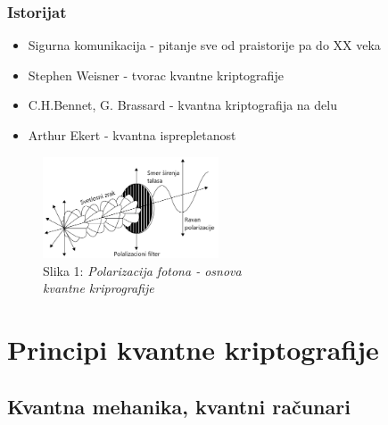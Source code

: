 \documentclass{beamer}
\begin{document}
\begin{frame}[fragile]

\frametitle{Istorijat}
\bigskip
	\begin{itemize}	
		\item Sigurna komunikacija - pitanje sve od praistorije pa do XX veka
		\item Stephen Weisner - tvorac kvantne kriptografije
      \item C.H.Bennet, G. Brassard - kvantna kriptografija na delu
      \item Arthur Ekert - kvantna isprepletanost
	\end{itemize}
 \begin{figure}[h!]
        \centering\includegraphics[height=3cm]{sl2.png} 
        \caption{Slika 1: \emph{Polarizacija fotona - osnova \\kvantne kriprografije}}
        \label{fig:polarizacija}
        \end{figure}
        
 
\end{frame}

\section{Principi kvantne kriptografije}

\subsection{Kvantna mehanika, kvantni računari}
\end{document}
